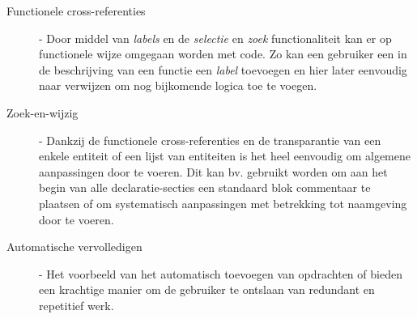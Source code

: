 \begin{description}

  \item[Functionele cross-referenties] - Door middel van \emph{labels} en de
  \emph{selectie} en \emph{zoek} functionaliteit kan er op functionele wijze
  omgegaan worden met code. Zo kan een gebruiker een in de beschrijving van een
  functie een \emph{label} toevoegen en hier later eenvoudig naar verwijzen om
  nog bijkomende logica toe te voegen.

  \item[Zoek-en-wijzig] - Dankzij de functionele cross-referenties en de
  transparantie van een enkele entiteit of een lijst van entiteiten is het heel
  eenvoudig om algemene aanpassingen door te voeren. Dit kan bv. gebruikt
  worden om aan het begin van alle declaratie-secties een standaard blok
  commentaar te plaatsen of om systematisch aanpassingen met betrekking tot
  naamgeving door te voeren.

  \item[Automatische vervolledigen] - Het voorbeeld van het automatisch
  toevoegen van  opdrachten of  bieden een
  krachtige manier om de gebruiker te ontslaan van redundant en repetitief werk.

\end{description}
